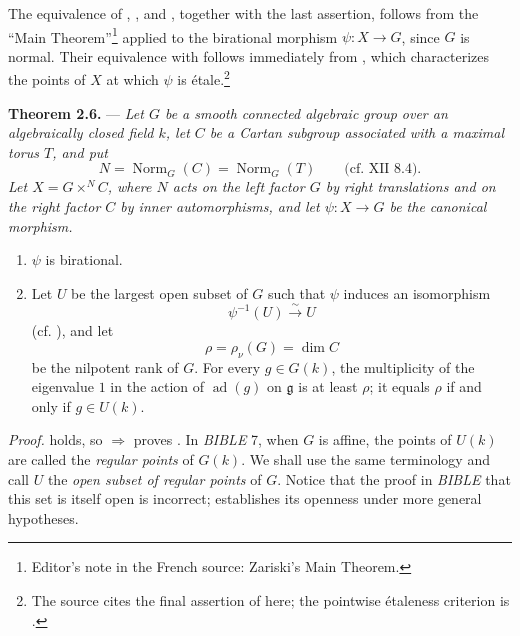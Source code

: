The equivalence of , , and , together with the last
assertion, follows from the ``Main Theorem''\footnote{Editor's note in
the French source: Zariski's Main Theorem.} applied to the
birational morphism \(\psi:X\to G\), since \(G\) is normal. Their
equivalence with  follows immediately from , which
characterizes the points of \(X\) at which \(\psi\) is
étale.\footnote{The source cites the final assertion of  here;
the pointwise étaleness criterion is .}

\medskip
\noindent{}\textbf{Theorem 2.6.} ---
\textit{Let \(G\) be a smooth connected algebraic group over an
algebraically closed field \(k\), let \(C\) be a Cartan subgroup
associated with a maximal torus \(T\), and put}
\[
  N=\operatorname{Norm}_G(C)=\operatorname{Norm}_G(T)
  \qquad\text{(cf. XII~8.4).}
\]
\textit{Let \(X=G\times^N C\), where \(N\) acts on the left factor
\(G\) by right translations and on the right factor \(C\) by inner
automorphisms, and let \(\psi:X\to G\) be the canonical morphism.}

\begin{enumerate}
\item[\textit{a)}] 
  \(\psi\) is birational.

\item[\textit{b)}] 
  Let \(U\) be the largest open subset of \(G\) such that \(\psi\)
  induces an isomorphism
  \[
    \psi^{-1}(U)\xrightarrow{\sim}U
  \]
  (cf. ), and let
  \[
    \rho=\rho_\nu(G)=\dim C
  \]
  be the nilpotent rank of \(G\). For every \(g\in G(k)\), the
  multiplicity of the eigenvalue \(1\) in the action of
  \(\operatorname{ad}(g)\) on \(\mathfrak g\) is at least \(\rho\);
  it equals \(\rho\) if and only if \(g\in U(k)\).
\end{enumerate}

\noindent\textit{Proof.}
 holds, so  \(\Rightarrow\)  proves .
In \emph{BIBLE} 7, when \(G\) is affine, the points of \(U(k)\) are
called the \emph{regular points} of \(G(k)\). We shall use the same
terminology and call \(U\) the \emph{open subset of regular points}
of \(G\). Notice that the proof in \emph{BIBLE} that this set is
itself open is incorrect;  establishes its
openness under more general hypotheses.

